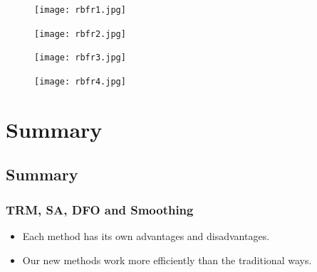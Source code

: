\documentclass[hyperref={pdfpagelabels=false}]{beamer}
\begin{document}

\begin{frame}
\begin{figure}
\texttt{[image: rbfr1.jpg]}
\end{figure}
\end{frame}


\begin{frame}
\begin{figure}
\texttt{[image: rbfr2.jpg]}
\end{figure}
\end{frame}


\begin{frame}
\begin{figure}
\texttt{[image: rbfr3.jpg]}
\end{figure}
\end{frame}


\begin{frame}
\begin{figure}
\texttt{[image: rbfr4.jpg]}
\end{figure}
\end{frame}


\section{Summary}

\subsection{Summary}

\begin{frame}
\frametitle{TRM, SA, DFO and Smoothing}
\begin{itemize}
\item Each method has its own advantages and disadvantages.
\item Our new methods work more efficiently than the traditional ways.
\end{itemize}
\end{frame}
\end{document}
